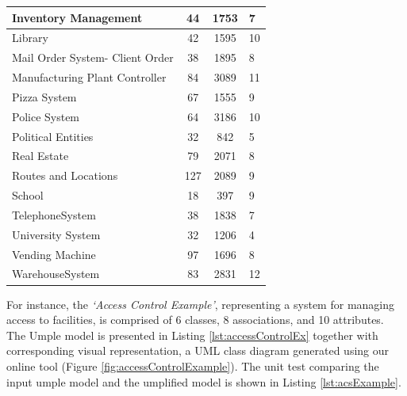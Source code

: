 \begin{table}
\begin{tabularx}{\textwidth}{l|SSX}
Inventory Management & 44 & 1753 & 7\\ \hline
Library & 42 & 1595 & 10\\ \hline
Mail Order System- Client Order & 38 & 1895 & 8\\ \hline
Manufacturing Plant Controller & 84 & 3089 & 11\\ \hline
Pizza System & 67 & 1555 & 9 \\ \hline
Police System & 64 & 3186 & 10\\ \hline
Political Entities & 32 & 842 & 5\\ \hline
Real Estate & 79 & 2071 & 8\\ \hline
Routes and Locations & 127 & 2089 & 9\\ \hline
School & 18 & 397 & 9\\ \hline
TelephoneSystem & 38 & 1838 & 7\\ \hline
University System & 32 & 1206 & 4\\ \hline
Vending Machine & 97 & 1696 & 8\\ \hline
WarehouseSystem & 83 & 2831 & 12\\ \hline
\hline
\end{tabularx}
\end{table}

For instance, the \textit{`Access Control Example'}, representing a system for managing access to facilities, is comprised of 6 classes, 8 associations, and 10 attributes. The Umple model is presented in Listing \ref{lst:accessControlEx} together with corresponding visual representation, a UML class diagram generated using our online tool (Figure \ref{fig:accessControlExample}). The unit test comparing the input umple model and the umplified model is shown in Listing \ref{lst:acsExample}.

